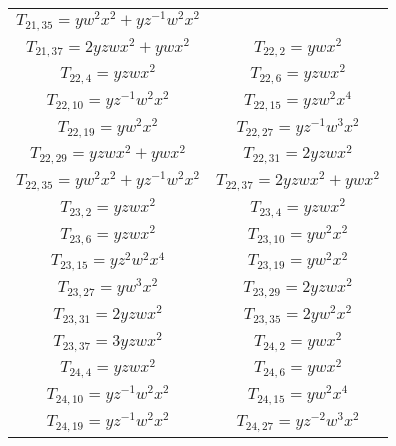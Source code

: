 \begin{longtable}{|c|c|}
$T_{21,35}= yw^2x^2+yz^{-1}w^2x^2$\\

$T_{21,37}= 2yzwx^2+ywx^2$ &

$T_{22,2}= ywx^2$\\

$T_{22,4}= yzwx^2$&

$T_{22,6}= yzwx^2$ \\

$T_{22,10}= yz^{-1}w^2x^2$&

$T_{22,15}= yzw^2x^4$\\

$T_{22,19}= yw^2x^2$&

$T_{22,27}= yz^{-1}w^3x^2$\\

$T_{22,29}= yzwx^2+ywx^2$& 

$T_{22,31}= 2yzwx^2$ \\

$T_{22,35}= yw^2x^2+yz^{-1}w^2x^2$ &

$T_{22,37}= 2yzwx^2+ywx^2$\\

$T_{23,2}= yzwx^2$ &

$T_{23,4}= yzwx^2$\\

$T_{23,6}= yzwx^2$&

$T_{23,10}= yw^2x^2$ \\

$T_{23,15}= yz^2w^2x^4$&

$T_{23,19}= yw^2x^2$\\

$T_{23,27}= yw^3x^2$&

$T_{23,29}= 2yzwx^2$\\

$T_{23,31}= 2yzwx^2$&

$T_{23,35}= 2yw^2x^2$\\

$T_{23,37}= 3yzwx^2$&

$T_{24,2}= ywx^2$\\

$T_{24,4}= yzwx^2$&

$T_{24,6}= ywx^2$\\

$T_{24,10}= yz^{-1}w^2x^2$&

$T_{24,15}= yw^2x^4$ \\

$T_{24,19}= yz^{-1}w^2x^2$&

$T_{24,27}= yz^{-2}w^3x^2$\\ 


\end{longtable}
